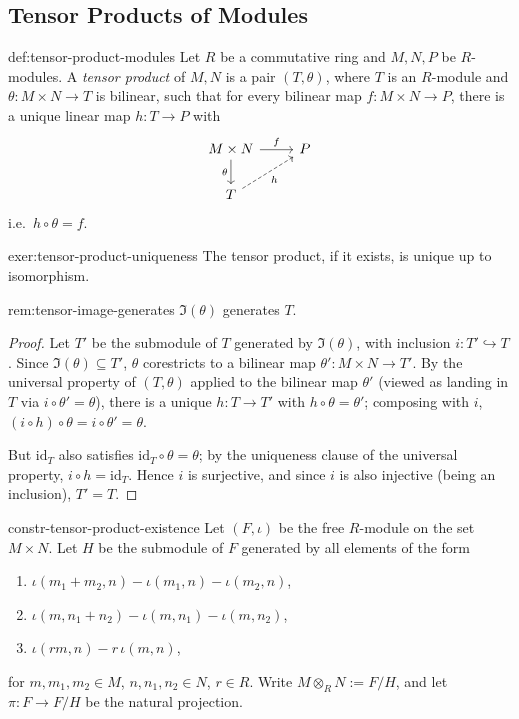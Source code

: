 \subsection*{Tensor Products of Modules}

\begin{definition}{}{def:tensor-product-modules}
Let $R$ be a commutative ring and $M,N,P$ be $R$-modules. A \emph{tensor product} of $M,N$ is a pair $(T,\theta)$, where $T$ is an $R$-module and $\theta: M\times N \to T$ is bilinear, such that for every bilinear map $f: M\times N \to P$, there is a unique linear map $h: T \to P$ with
\[
\begin{tikzcd}
M\times N \arrow[r,"f"] \arrow[d,"\theta"'] & P \\
T \arrow[ur,dashed,"h"'] &
\end{tikzcd}
\]
i.e.\ $h\circ\theta=f$.
\end{definition}

\begin{exercise}{}{exer:tensor-product-uniqueness}
The tensor product, if it exists, is unique up to isomorphism.
\end{exercise}

\begin{remark}{}{rem:tensor-image-generates}
$\Im(\theta)$ generates $T$.
\end{remark}

\begin{proof}
Let $T'$ be the submodule of $T$ generated by $\Im(\theta)$, with inclusion $i: T' \hookrightarrow T$. Since $\Im(\theta) \subseteq T'$, $\theta$ corestricts to a bilinear map $\theta': M\times N \to T'$. By the universal property of $(T,\theta)$ applied to the bilinear map $\theta'$ (viewed as landing in $T$ via $i\circ\theta'=\theta$), there is a unique $h: T \to T'$ with $h\circ\theta = \theta'$; composing with $i$, $(i\circ h)\circ\theta = i\circ\theta' = \theta$.

But $\mathrm{id}_T$ also satisfies $\mathrm{id}_T\circ\theta = \theta$; by the uniqueness clause of the universal property, $i\circ h = \mathrm{id}_T$. Hence $i$ is surjective, and since $i$ is also injective (being an inclusion), $T' = T$.
\end{proof}

\begin{construction}{}{constr-tensor-product-existence}
Let $(F,\iota)$ be the free $R$-module on the set $M\times N$. Let $H$ be the submodule of $F$ generated by all elements of the form
\begin{enumerate}[label=(\alph*)]
    \item $\iota(m_1+m_2,n) - \iota(m_1,n) - \iota(m_2,n)$,
    \item $\iota(m,n_1+n_2) - \iota(m,n_1) - \iota(m,n_2)$,
    \item $\iota(rm,n) - r\,\iota(m,n)$,
\end{enumerate}
for $m,m_1,m_2\in M$, $n,n_1,n_2\in N$, $r\in R$. Write $M\otimes_R N := F/H$, and let $\pi: F \to F/H$ be the natural projection.
\end{construction}

